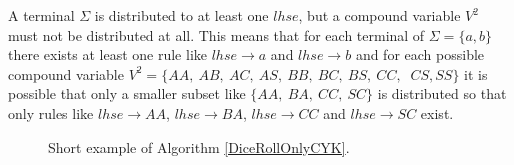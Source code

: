 \noindent
{}
A terminal $\Sigma$ is distributed to at least one $lhse$, but a compound variable $V^2$ must not be distributed at all. This means that for each terminal of $\Sigma=\{a,b\}$ there exists at least one rule like $lhse\rightarrow a$ and $lhse\rightarrow b$ and for each possible compound variable $V^2=\{AA,~AB,~AC,~AS,~BB,~BC,~BS,~CC,$ $~CS,SS\}$ it is possible that only a smaller subset like $\{AA,~BA,~CC,~SC\}$ is distributed so that only rules like $lhse\rightarrow AA$, $lhse\rightarrow BA$, $lhse\rightarrow CC$ and $lhse\rightarrow SC$ exist.
\noindent
\begin{figure} [h]
	\begin{minipage}{6in}
		\centering
	\end{minipage}
	\caption{Short example of Algorithm \ref{DiceRollOnlyCYK}.}
	\label{DiceRollONlyCYKExample}
\end{figure}
